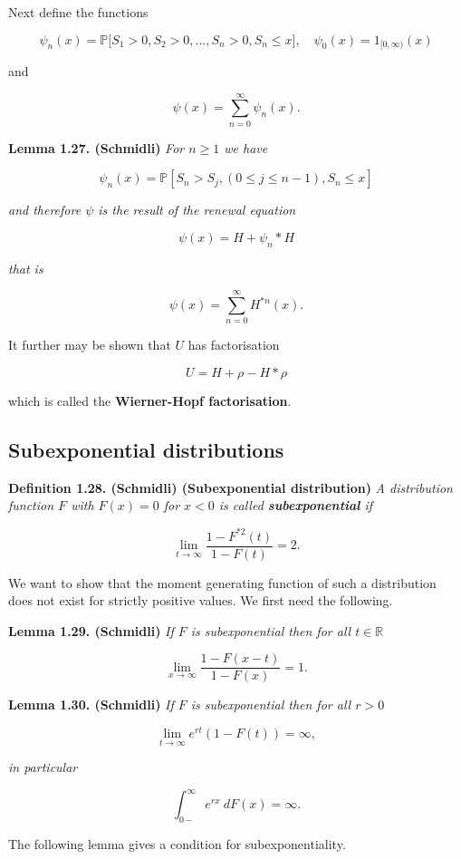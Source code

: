 \documentclass[a4paper,12pt,openany]{book}
\begin{document}
Next define the functions

\[
\psi_n(x)=\mathbb P\Big[S_1>0,S_2>0,...,S_n>0,S_n\le x\Big],\quad \psi_0(x)=1_{[0,\infty)}(x)
\]

and

\[
\psi(x)=\sum_{n=0}^\infty \psi_n(x).
\]

\textbf{Lemma 1.27. (Schmidli)} \emph{For \(n\ge 1\) we have}

\[
\psi_n(x)=\mathbb P[S_n>S_j, (0\le j\le n-1),S_n\le x]
\]

\emph{and therefore \(\psi\) is the result of the renewal equation}

\[
\psi(x)=H + \psi_n* H
\]

\emph{that is}

\[
\psi(x)=\sum_{n=0}^\infty H^{*n}(x).
\]

It further may be shown that \(U\) has factorisation

\[
U=H+\rho-H * \rho
\]

which is called the \textbf{Wierner-Hopf factorisation}.

\hypertarget{subexponential-distributions}{%
\subsection{Subexponential distributions}\label{subexponential-distributions}}

\textbf{Definition 1.28. (Schmidli) (Subexponential distribution)} \emph{A distribution function \(F\) with \(F(x)=0\) for \(x<0\) is called \textbf{subexponential} if}

\[
\lim_{t\to\infty}\frac{1-F^{*2}(t)}{1-F(t)}=2.
\]

We want to show that the moment generating function of such a distribution does not exist for strictly positive values. We first need the following.

\textbf{Lemma 1.29. (Schmidli)} \emph{If \(F\) is subexponential then for all \(t\in\mathbb R\)}

\[
\lim_{x\to\infty}\frac{1-F(x-t)}{1-F(x)}=1.
\]

\textbf{Lemma 1.30. (Schmidli)} \emph{If \(F\) is subexponential then for all \(r>0\)}

\[
\lim_{t\to\infty}e^{rt}(1-F(t))=\infty,
\]

\emph{in particular}

\[
\int_{0-}^\infty e^{rx}\ dF(x)=\infty.
\]

The following lemma gives a condition for subexponentiality.
\end{document}

